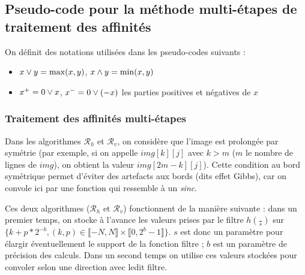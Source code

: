 \subsection{Pseudo-code pour la méthode multi-étapes de traitement des affinités}

 On définit des notations utilisées dans les pseudo-codes suivants :
 \begin{itemize}
 \item $x \vee y = \max(x,y)$, $x \wedge y = \min(x,y)$
 \item $x^+ = 0 \vee x$, $x^- = 0 \vee (-x)$ les parties positives et négatives de $x$
 \end{itemize}
 
 \subsubsection{Traitement des affinités multi-étapes}
  
  Dans les algorithmes $\mathcal{R}_h$ et $\mathcal{R}_v$, on considère que l'image est prolongée par symétrie (par exemple, si on appelle $img[k][j]$ avec $k > m$ ($m$ le nombre de lignes de $img$), on obtient la valeur $img[2m-k][j]$). Cette condition au bord symétrique permet d'éviter des artefacts aux bords (dits effet Gibbs), car on convole ici par une fonction qui ressemble à un \emph{sinc}.
  
  Ces deux algorithmes ($\mathcal{R}_h$ et $\mathcal{R}_v$) fonctionnent de la manière suivante : dans un premier temps, on stocke à l'avance les valeurs prises par le filtre $h(\frac{\dot{}}{s})$ sur $\{k+p*2^{-b},(k,p)\in \llbracket -N,N \rrbracket \times \llbracket 0,2^b-1 \rrbracket\}$. $s$ est donc un paramètre pour élargir éventuellement le support de la fonction filtre ; $b$ est un paramètre de précision des calculs. Dans un second  temps on utilise ces valeurs stockées pour convoler selon une direction avec ledit filtre.
  
